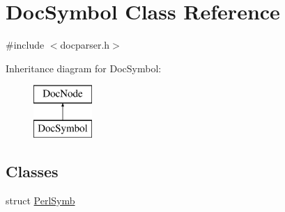 \hypertarget{class_doc_symbol}{}\section{Doc\+Symbol Class Reference}
\label{class_doc_symbol}


{\ttfamily \#include $<$docparser.\+h$>$}

Inheritance diagram for Doc\+Symbol\+:\begin{figure}[H]
\begin{center}
\leavevmode
\includegraphics[height=2.000000cm]{class_doc_symbol}
\end{center}
\end{figure}
\subsection*{Classes}
\begin{DoxyCompactItemize}
\item 
struct \mbox{\hyperlink{struct_doc_symbol_1_1_perl_symb}{Perl\+Symb}}
\end{DoxyCompactItemize}
